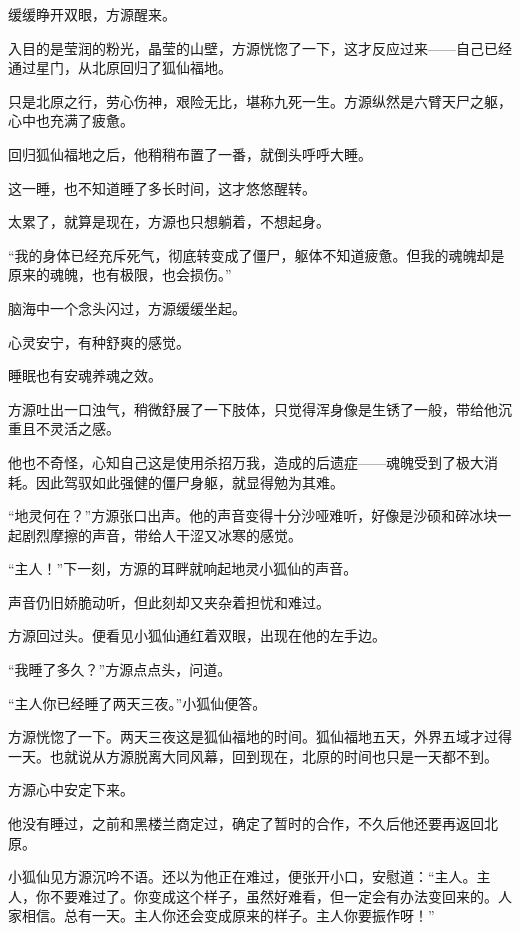 
\begin{this_body}



缓缓睁开双眼，方源醒来。

入目的是莹润的粉光，晶莹的山壁，方源恍惚了一下，这才反应过来——自己已经通过星门，从北原回归了狐仙福地。

只是北原之行，劳心伤神，艰险无比，堪称九死一生。方源纵然是六臂天尸之躯，心中也充满了疲惫。

回归狐仙福地之后，他稍稍布置了一番，就倒头呼呼大睡。

这一睡，也不知道睡了多长时间，这才悠悠醒转。

太累了，就算是现在，方源也只想躺着，不想起身。

“我的身体已经充斥死气，彻底转变成了僵尸，躯体不知道疲惫。但我的魂魄却是原来的魂魄，也有极限，也会损伤。”

脑海中一个念头闪过，方源缓缓坐起。

心灵安宁，有种舒爽的感觉。

睡眠也有安魂养魂之效。

方源吐出一口浊气，稍微舒展了一下肢体，只觉得浑身像是生锈了一般，带给他沉重且不灵活之感。

他也不奇怪，心知自己这是使用杀招万我，造成的后遗症——魂魄受到了极大消耗。因此驾驭如此强健的僵尸身躯，就显得勉为其难。

“地灵何在？”方源张口出声。他的声音变得十分沙哑难听，好像是沙硕和碎冰块一起剧烈摩擦的声音，带给人干涩又冰寒的感觉。

“主人！”下一刻，方源的耳畔就响起地灵小狐仙的声音。

声音仍旧娇脆动听，但此刻却又夹杂着担忧和难过。

方源回过头。便看见小狐仙通红着双眼，出现在他的左手边。

“我睡了多久？”方源点点头，问道。

“主人你已经睡了两天三夜。”小狐仙便答。

方源恍惚了一下。两天三夜这是狐仙福地的时间。狐仙福地五天，外界五域才过得一天。也就说从方源脱离大同风幕，回到现在，北原的时间也只是一天都不到。

方源心中安定下来。

他没有睡过，之前和黑楼兰商定过，确定了暂时的合作，不久后他还要再返回北原。

小狐仙见方源沉吟不语。还以为他正在难过，便张开小口，安慰道：“主人。主人，你不要难过了。你变成这个样子，虽然好难看，但一定会有办法变回来的。人家相信。总有一天。主人你还会变成原来的样子。主人你要振作呀！”


\end{this_body}
